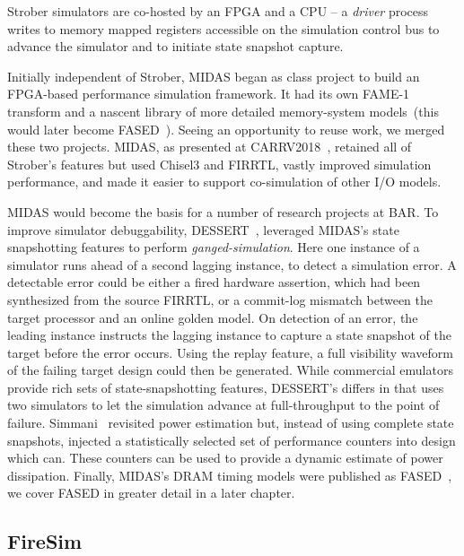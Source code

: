 Strober simulators are co-hosted by an FPGA and a CPU -- a \emph{driver}
process writes to memory mapped registers accessible on the simulation control
bus to advance the simulator and to initiate state snapshot capture.

Initially independent of Strober, MIDAS began as class project to build an
FPGA-based performance simulation framework. It had its own FAME-1 transform
and a nascent library of more detailed memory-system models~(this would later
become FASED~\cite{FASED}).  Seeing an opportunity to reuse work, we merged
these two projects. MIDAS, as presented at CARRV2018~\cite{MIDAS}, retained all
of Strober's features but used Chisel3 and FIRRTL, vastly improved simulation
performance, and made it easier to support co-simulation of other I/O models.

MIDAS would become the basis for a number of research projects at BAR. To improve simulator debuggability, DESSERT~\cite{DESSERT},
leveraged MIDAS's state snapshotting features to perform
\emph{ganged-simulation}. Here one instance of a simulator runs ahead of a second lagging instance, to
detect a simulation error. A detectable error could be either a fired hardware assertion, which had been synthesized from the source FIRRTL, or a
commit-log mismatch between the target processor and an online golden model.
On detection of an error, the leading instance instructs the lagging instance to capture a
state snapshot of the target before the error occurs.  Using the replay feature, a
full visibility waveform of the failing target design could then be generated. While
commercial emulators provide rich sets of state-snapshotting features,
DESSERT's differs in that uses two simulators to let the simulation advance at
full-throughput to the point of failure. Simmani~\cite{Simmani} revisited power
estimation but, instead of using complete state snapshots, injected
a statistically selected set of performance counters into design which can. These counters
can be used to provide a dynamic estimate of power dissipation. Finally,
MIDAS's DRAM timing models were published as FASED~\cite{FASED}, we cover FASED
in greater detail in a later chapter.

\subsection{FireSim}

